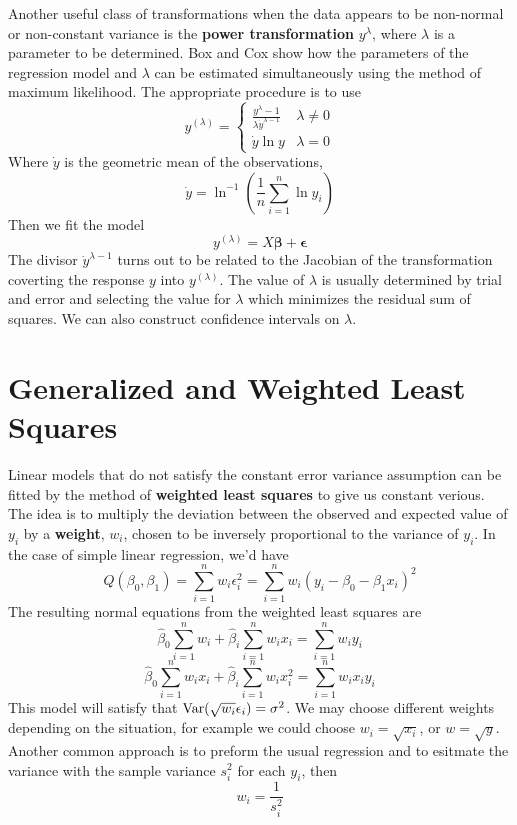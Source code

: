 Another useful class of transformations when the data appears to be non-normal or non-constant variance is the \textbf{power transformation} $y^\lambda$, where $\lambda$ is a parameter to be determined. Box and Cox show how the parameters of the regression model and $\lambda$ can be estimated simultaneously using the method of maximum likelihood. The appropriate procedure is to use 
\[y^{(\lambda)} = \begin{cases}
    \frac{y^\lambda - 1}{\lambda \dot{y}^{\lambda-1}} & \lambda \neq 0\\
    \dot{y}\ln y & \lambda = 0
\end{cases}\]
Where $\dot{y}$ is the geometric mean of the observations,
\[\dot{y} = \ln^{-1}\left(\frac{1}{n}\sum_{i=1}^n \ln y_i\right)\]
Then we fit the model 
\[y^{(\lambda)} = X\boldsymbol{\beta} + \boldsymbol{\epsilon}\]
The divisor $\dot{y}^{\lambda-1}$ turns out to be related to the Jacobian of the transformation coverting the response $y$ into $y^{(\lambda)}$. The value of $\lambda$ is usually determined by trial and error and selecting the value for $\lambda$ which minimizes the residual sum of squares. We can also construct confidence intervals on $\lambda$. 

\section{Generalized and Weighted Least Squares}

Linear models that do not satisfy the constant error variance assumption can be fitted by the method of \textbf{weighted least squares} to give us constant verious. The idea is to multiply the deviation between the observed and expected value of $y_i$ by a \textbf{weight}, $w_i$, chosen to be inversely proportional to the variance of $y_i$. In the case of simple linear regression, we'd have 
\[Q(\beta_0, \beta_1) = \sum_{i=1}^n w_i\epsilon_i^2 = \sum_{i=1}^n w_i(y_i - \beta_0 - \beta_1x_i)^2\]
The resulting normal equations from the weighted least squares are 
\[\hat{\beta}_0 \sum_{i=1}^n w_i + \hat{\beta}_i \sum_{i=1}^n w_ix_i = \sum_{i=1}^n w_iy_i\]
\[\hat{\beta}_0 \sum_{i=1}^n w_ix_i+ \hat{\beta}_i \sum_{i=1}^n w_ix_i^2 = \sum_{i=1}^n w_ix_iy_i\]
This model will satisfy that $\operatorname{Var}(\sqrt{w_i}\epsilon_i) = \sigma^2$. We may choose different weights depending on the situation, for example we could choose $w_i = \sqrt{x_i}$, or $w = \sqrt{y}$. Another common approach is to preform the usual regression and to esitmate the variance with the sample variance $s_i^2$ for each $y_i$, then 
\[w_i = \frac{1}{s_i^2}\]
